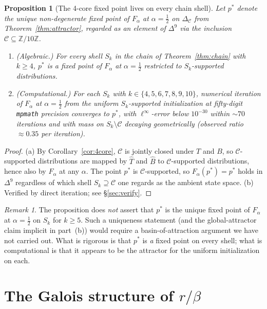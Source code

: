 \documentclass[11pt,reqno]{amsart}
\theoremstyle{plain}
\newtheorem{proposition}[theorem]{Proposition}
\theoremstyle{definition}
\theoremstyle{remark}
\newtheorem*{remark}{Remark}
\newcommand{\Z}{\mathbb{Z}}
\newcommand{\Zten}{\Z/10\Z}
\newcommand{\Cfour}{\mathcal{C}}
\newcommand{\Tfuse}{\widehat{T}}
\newcommand{\Bfuse}{\widehat{B}}
\newcommand{\Fmix}{F_{\alpha}}
\newcommand{\Simp}{\Delta^{9}}
\begin{document}
\begin{proposition}[The 4-core fixed point lives on every chain shell]\label{prop:universal}
Let $p^{*}$ denote the unique non-degenerate fixed point of $\Fmix$
at $\alpha=\tfrac12$ on $\Delta_{\Cfour}$ from
Theorem~\ref{thm:attractor}, regarded as an element of $\Simp$ via
the inclusion $\Cfour\subseteq\Zten$.
\begin{enumerate}\setlength\itemsep{0pt}
\item[(a)] (Algebraic.) For every shell $S_{k}$ in the chain of
Theorem~\ref{thm:chain} with $k\geq 4$, $p^{*}$ is a fixed point
of $\Fmix$ at $\alpha=\tfrac12$ restricted to $S_{k}$-supported
distributions.
\item[(b)] (Computational.) For each $S_{k}$ with
$k\in\{4,5,6,7,8,9,10\}$, numerical iteration of $\Fmix$ at
$\alpha=\tfrac12$ from the uniform $S_{k}$-supported initialization
at fifty-digit \texttt{mpmath} precision converges to $p^{*}$, with
$\ell^{\infty}$-error below $10^{-30}$ within $\sim 70$ iterations
and with mass on $S_{k}\setminus\Cfour$ decaying geometrically
(observed ratio $\approx 0.35$ per iteration).
\end{enumerate}
\end{proposition}

\begin{proof}
(a) By Corollary~\ref{cor:4core}, $\Cfour$ is jointly closed under
$T$ and $B$, so $\Cfour$-supported distributions are mapped by
$\Tfuse$ and $\Bfuse$ to $\Cfour$-supported distributions, hence
also by $\Fmix$ at any $\alpha$. The point $p^{*}$ is
$\Cfour$-supported, so $\Fmix(p^{*})=p^{*}$ holds in $\Simp$
regardless of which shell $S_{k}\supseteq\Cfour$ one regards as the
ambient state space. (b) Verified by direct iteration; see
\S\ref{sec:verify}.
\end{proof}

\begin{remark}
The proposition does \emph{not} assert that $p^{*}$ is the unique
fixed point of $\Fmix$ at $\alpha=\tfrac12$ on $S_{k}$ for
$k\geq 5$. Such a uniqueness statement (and the global-attractor
claim implicit in part~(b)) would require a basin-of-attraction
argument we have not carried out. What is rigorous is that $p^{*}$
is \emph{a} fixed point on every shell; what is computational is
that it appears to be the attractor for the uniform initialization
on each.
\end{remark}

\section{The Galois structure of $r/\beta$}\label{sec:galois}
\end{document}
